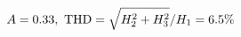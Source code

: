 \documentclass[preview]{standalone}
\begin{document}
\begin{align*}
\special{dvisvgm:raw <g id='unique000'>}A=0.33,\ \text{THD}=\sqrt{H_2^2+H_3^2}/H_1=6.5\%\special{dvisvgm:raw </g>}
\end{align*}
\end{document}
